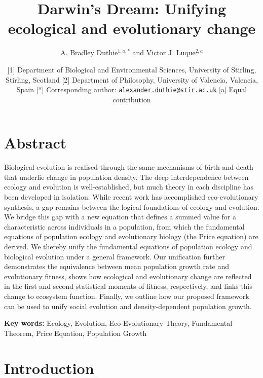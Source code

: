 \documentclass[
]{article}
\title{Darwin's Dream: Unifying ecological and evolutionary change}
\author{A. Bradley Duthie\(^{1,a,*}\) and Victor J. Luque\(^{2,a}\)}
\date{{[}1{]} Department of Biological and Environmental Sciences,
University of Stirling, Stirling, Scotland {[}2{]} Department of
Philosophy, University of Valencia, Valencia, Spain {[}*{]}
Corresponding author:
\href{mailto:alexander.duthie@stir.ac.uk}{\nolinkurl{alexander.duthie@stir.ac.uk}}
{[}a{]} Equal contribution}
\begin{document}
\maketitle

\hypertarget{abstract}{%
\section{Abstract}\label{abstract}}

Biological evolution is realised through the same mechanisms of birth
and death that underlie change in population density. The deep
interdependence between ecology and evolution is well-established, but
much theory in each discipline has been developed in isolation. While
recent work has accomplished eco-evolutionary synthesis, a gap remains
between the logical foundations of ecology and evolution. We bridge this
gap with a new equation that defines a summed value for a characteristic
across individuals in a population, from which the fundamental equations
of population ecology and evolutionary biology (the Price equation) are
derived. We thereby unify the fundamental equations of population
ecology and biological evolution under a general framework. Our
unification further demonstrates the equivalence between mean population
growth rate and evolutionary fitness, shows how ecological and
evolutionary change are reflected in the first and second statistical
moments of fitness, respectively, and links this change to ecosystem
function. Finally, we outline how our proposed framework can be used to
unify social evolution and density-dependent population growth.

\textbf{Key words:} Ecology, Evolution, Eco-Evolutionary Theory,
Fundamental Theorem, Price Equation, Population Growth

\hypertarget{introduction}{%
\section{Introduction}\label{introduction}}
\end{document}
